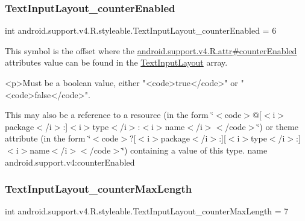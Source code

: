 \subsubsection{\texorpdfstring{Text\+Input\+Layout\+\_\+counter\+Enabled}{TextInputLayout\_counterEnabled}}
{\footnotesize\ttfamily int android.\+support.\+v4.\+R.\+styleable.\+Text\+Input\+Layout\+\_\+counter\+Enabled = 6\hspace{0.3cm}{\ttfamily [static]}}

This symbol is the offset where the \hyperlink{classandroid_1_1support_1_1v4_1_1R_1_1attr_a5f0d30d13641754ac1c2587ef5593bca}{android.\+support.\+v4.\+R.\+attr\#counter\+Enabled} attribute\textquotesingle{}s value can be found in the \hyperlink{classandroid_1_1support_1_1v4_1_1R_1_1styleable_a86943debf88d7a9dc4c0627a8546913d}{Text\+Input\+Layout} array.

\begin{DoxyVerb}      <p>Must be a boolean value, either "<code>true</code>" or "<code>false</code>".
\end{DoxyVerb}
 

This may also be a reference to a resource (in the form \char`\"{}$<$code$>$@\mbox{[}$<$i$>$package$<$/i$>$\+:\mbox{]}$<$i$>$type$<$/i$>$\+:$<$i$>$name$<$/i$>$$<$/code$>$\char`\"{}) or theme attribute (in the form \char`\"{}$<$code$>$?\mbox{[}$<$i$>$package$<$/i$>$\+:\mbox{]}\mbox{[}$<$i$>$type$<$/i$>$\+:\mbox{]}$<$i$>$name$<$/i$>$$<$/code$>$\char`\"{}) containing a value of this type.  name android.\+support.\+v4\+:counter\+Enabled \mbox{\label{classandroid_1_1support_1_1v4_1_1R_1_1styleable_a493f8299f04aee557c2fb4f3baaaea72}} 
\subsubsection{\texorpdfstring{Text\+Input\+Layout\+\_\+counter\+Max\+Length}{TextInputLayout\_counterMaxLength}}
{\footnotesize\ttfamily int android.\+support.\+v4.\+R.\+styleable.\+Text\+Input\+Layout\+\_\+counter\+Max\+Length = 7\hspace{0.3cm}{\ttfamily [static]}}

